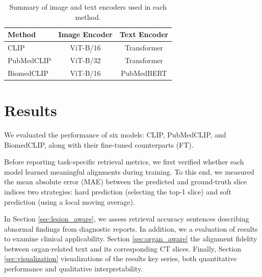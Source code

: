 \documentclass[bioengineering,article,submit,pdftex,moreauthors]{Definitions/mdpi}
\begin{document}
\begin{table}[ht]
  \centering
  \caption{ Summary of image and text encoders used in each method.}
  \label{tab:model_summary}
  \begin{tabular}{lcc}
    \toprule
    Method                  & Image Encoder      & Text Encoder       \\
    \midrule
    CLIP                    & ViT-B/16          & Transformer        \\
    PubMedCLIP              & ViT-B/32          & Transformer        \\
    BiomedCLIP              & ViT-B/16          & PubMedBERT         \\
    \bottomrule
  \end{tabular}
\end{table}


\section{Results}

We evaluated the  performance of six models:  CLIP, PubMedCLIP, and BiomedCLIP, along with their fine-tuned counterparts (FT). 

  Before reporting task-specific retrieval metrics, we first verified whether each model learned meaningful alignments during training. To this end, we measured the mean absolute error (MAE) between the predicted and ground-truth slice indices  two strategies: hard prediction (selecting the top-1 slice) and soft prediction (using a local moving average).

In Section \ref{sec:lesion_aware}, we assess retrieval accuracy  sentences describing abnormal findings from diagnostic reports. 
In addition, we  a  evaluation of   results to examine clinical applicability.
Section \ref{sec:organ_aware}  the alignment fidelity between organ-related text and its corresponding CT slices. 
Finally, Section \ref{sec:visualization}  visualizations of the  results  key series,  both quantitative performance and qualitative interpretability.
\end{document}
